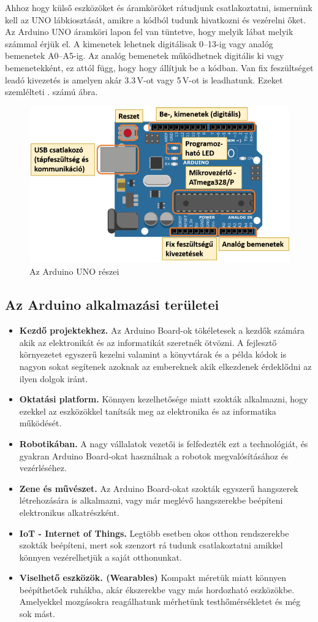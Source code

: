 \documentclass[]{thesis-ekf}
\theoremstyle{definition}
\theoremstyle{remark}
\begin{document}
Ahhoz hogy külső eszközöket és áramköröket rátudjunk csatlakoztatni, ismernünk kell az UNO lábkiosztását, amikre a kódból tudunk hivatkozni és vezérelni őket. Az Arduino UNO áramköri lapon fel van tüntetve, hogy melyik lábat melyik számmal érjük el. A kimenetek lehetnek digitálisak 0--13-ig vagy analóg bemenetek A0--A5-ig. Az analóg bemenetek működhetnek digitális ki vagy bemenetekként, ez attól függ, hogy hogy állítjuk be a kódban. Van fix feszültséget leadó kivezetés is amelyen akár 3.3\,V-ot vagy 5\,V-ot is leadhatunk. Ezeket szemlélteti . számú ábra.
\begin{figure}[th!]
	\centering
	\includegraphics[width=0.7\linewidth]{ArduinoParts}
	\caption{Az Arduino UNO részei}
	\label{fig-arduinoparts}
\end{figure}
\subsection{Az Arduino alkalmazási területei}
\begin{itemize}
	\item \textbf{Kezdő projektekhez.} Az Arduino Board-ok tökéletesek a kezdők számára akik az elektronikát és az informatikát szeretnék ötvözni. A fejlesztő környezetet egyszerű kezelni valamint a könyvtárak és a példa kódok is nagyon sokat segítenek azoknak az embereknek akik elkezdenek érdeklődni az ilyen dolgok iránt.
	\item \textbf{Oktatási platform.} Könnyen kezelhetősége miatt szokták alkalmazni, hogy ezekkel az eszközökkel tanítsák meg az elektronika és az informatika működését.
	\item \textbf{Robotikában.} A nagy vállalatok vezetői is felfedezték ezt a technológiát, és gyakran Arduino Board-okat használnak a robotok megvalósításához és vezérléséhez.
	\item \textbf{Zene és művészet.} Az Arduino Board-okat szokták egyszerű hangszerek létrehozására is alkalmazni, vagy már meglévő hangszerekbe beépíteni elektronikus alkatrészként.
	\item \textbf{IoT - Internet of Things.} Legtöbb esetben okos otthon rendszerekbe szokták beépíteni, mert sok szenzort rá tudunk csatlakoztatni amikkel könnyen vezérelhetjük a saját otthonunkat. 
	\item \textbf{Viselhető eszközök. (Wearables)} Kompakt méretük miatt könnyen beépíthetőek ruhákba, akár ékszerekbe vagy más hordozható eszközökbe. Amelyekkel mozgásokra reagálhatunk mérhetünk testhőmérsékletet és még sok mást.
\end{itemize}
\end{document}
